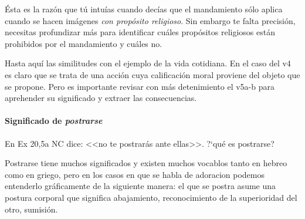 \documentclass{article}
\begin{document}
\'Esta es la raz\'on que t\'u intu\'{i}as cuando dec\'{i}as que el mandamiento s\'olo aplica cuando se hacen im\'agenes \emph{con prop\'osito religioso}. Sin embargo te falta precisi\'on, necesitas profundizar m\'as para identificar cu\'ales prop\'ositos religiosos est\'an prohibidos por el mandamiento y cu\'ales no.

Hasta aqu\'{i} las similitudes con el ejemplo de la vida cotidiana. En el caso del v4 es claro que se trata de una acci\'on cuya calificaci\'on moral proviene del objeto que se propone. Pero es importante revisar con m\'as detenimiento el v5a-b para aprehender su significado y extraer las consecuencias.

\paragraph{Significado de \emph{postrarse}}

En Ex 20,5a NC dice: <<no te postrar\'as ante ellas>>. ?`qu\'e es postrarse?

Postrarse tiene muchos significados y existen muchos vocablos tanto en hebreo como en griego, pero en los casos en que se habla de adoracion podemos entenderlo gr\'aficamente de la siguiente manera: el que se postra asume una postura corporal que significa abajamiento, reconocimiento de la superioridad del otro, sumisi\'on.
\end{document}
